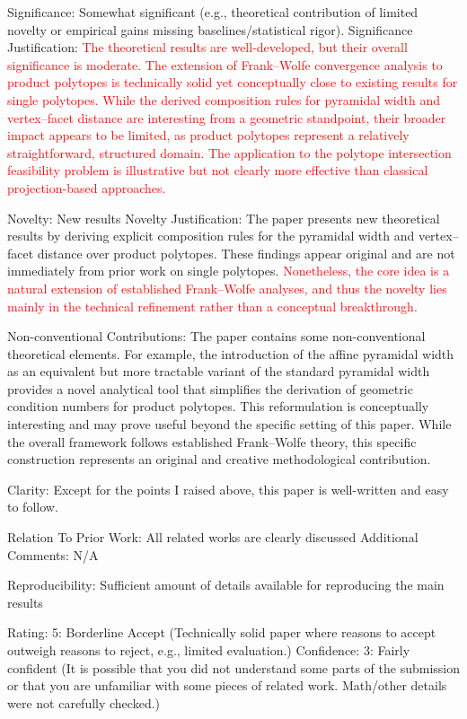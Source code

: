 \documentclass[a4wide]{article}
\begin{document}
Significance: Somewhat significant (e.g., theoretical contribution of limited novelty or empirical gains missing baselines/statistical rigor).
Significance Justification:
\textcolor{red}{The theoretical results are well-developed, but their overall significance is moderate. The extension of Frank–Wolfe convergence analysis to product polytopes is technically solid yet conceptually close to existing results for single polytopes. While the derived composition rules for pyramidal width and vertex–facet distance are interesting from a geometric standpoint, their broader impact appears to be limited, as product polytopes represent a relatively straightforward, structured domain. The application to the polytope intersection feasibility problem is illustrative but not clearly more effective than classical projection-based approaches.}

Novelty: New results
Novelty Justification:
The paper presents new theoretical results by deriving explicit composition rules for the pyramidal width and vertex–facet distance over product polytopes. These findings appear original and are not immediately from prior work on single polytopes. \textcolor{red}{Nonetheless, the core idea is a natural extension of established Frank–Wolfe analyses, and thus the novelty lies mainly in the technical refinement rather than a conceptual breakthrough.}

Non-conventional Contributions:
The paper contains some non-conventional theoretical elements. For example, the introduction of the affine pyramidal width as an equivalent but more tractable variant of the standard pyramidal width provides a novel analytical tool that simplifies the derivation of geometric condition numbers for product polytopes. This reformulation is conceptually interesting and may prove useful beyond the specific setting of this paper. While the overall framework follows established Frank–Wolfe theory, this specific construction represents an original and creative methodological contribution.

Clarity:
Except for the points I raised above, this paper is well-written and easy to follow.

Relation To Prior Work: All related works are clearly discussed
Additional Comments:
N/A

Reproducibility: Sufficient amount of details available for reproducing the main results

Rating: 5: Borderline Accept (Technically solid paper where reasons to accept outweigh reasons to reject, e.g., limited evaluation.)
Confidence: 3: Fairly confident (It is possible that you did not understand some parts of the submission or that you are unfamiliar with some pieces of related work. Math/other details were not carefully checked.)
\end{document}
